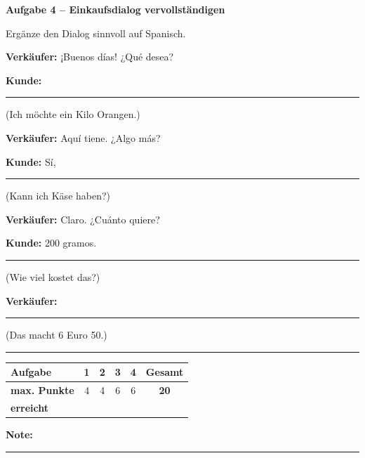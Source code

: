 \documentclass[11pt, a4paper]{article}
\newcommand{\fachfarbe}{spanisch}
\newcommand{\punktebox}[1]{\hfill\fbox{\small \_/#1}}
\newcommand{\luecke}[1]{\rule{#1}{0.4pt}}
\newenvironment{aufgabe}[1]{%
    \needspace{5\baselineskip}%
    \nopagebreak[4]%
    \vspace{10pt}
    \noindent\textbf{\textcolor{\fachfarbe}{Aufgabe #1}}
    \nopagebreak[4]%
    \vspace{5pt}
    \nopagebreak[4]%
    \begin{list}{}{\leftmargin=0pt}
    \item[]
}{%
    \end{list}
}
\begin{document}

\begin{aufgabe}{4 -- Einkaufsdialog vervollständigen}
Ergänze den Dialog sinnvoll auf Spanisch. \punktebox{6}
\end{aufgabe}

\noindent
\textbf{Verkäufer:} ¡Buenos días! ¿Qué desea?

\vspace{0.8em}

\noindent
\textbf{Kunde:} \luecke{8cm} \hfill (Ich möchte ein Kilo Orangen.)

\vspace{0.8em}

\noindent
\textbf{Verkäufer:} Aquí tiene. ¿Algo más?

\vspace{0.8em}

\noindent
\textbf{Kunde:} Sí, \luecke{6cm} \hfill (Kann ich Käse haben?)

\vspace{0.8em}

\noindent
\textbf{Verkäufer:} Claro. ¿Cuánto quiere?

\vspace{0.8em}

\noindent
\textbf{Kunde:} 200 gramos. \luecke{4cm} \hfill (Wie viel kostet das?)

\vspace{0.8em}

\noindent
\textbf{Verkäufer:} \luecke{6cm} \hfill (Das macht 6 Euro 50.)


\vspace{25pt}
\hrule
\vspace{10pt}

\noindent
\begin{tabularx}{\textwidth}{|X|c|c|c|c||c|}
\hline
\textbf{Aufgabe} & 1 & 2 & 3 & 4 & \textbf{Gesamt} \\
\hline
\textbf{max. Punkte} & 4 & 4 & 6 & 6 & \textbf{20} \\
\hline
\textbf{erreicht} & & & & & \\[0.8em]
\hline
\end{tabularx}

\vspace{10pt}

\begin{flushright}
\textbf{Note:} \luecke{2cm}
\end{flushright}
\end{document}
